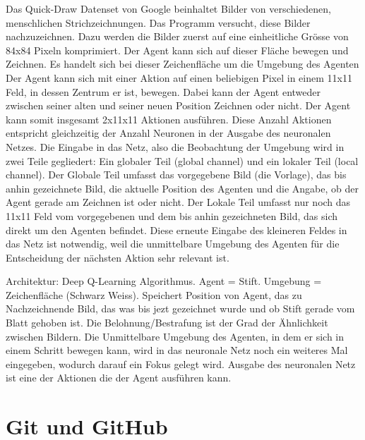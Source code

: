 Das Quick-Draw Datenset von Google beinhaltet Bilder von verschiedenen,
menschlichen Strichzeichnungen. Das Programm versucht, diese Bilder
nachzuzeichnen. Dazu werden die Bilder zuerst auf eine einheitliche Grösse von
84x84 Pixeln komprimiert. Der Agent kann sich auf dieser Fläche bewegen und
Zeichnen. Es handelt sich bei dieser Zeichenfläche um die Umgebung des Agenten
Der Agent kann sich mit einer Aktion auf einen beliebigen Pixel in einem 11x11
Feld, in dessen Zentrum er ist, bewegen. Dabei kann der Agent entweder zwischen
seiner alten und seiner neuen Position Zeichnen oder nicht. Der Agent kann somit
insgesamt 2x11x11 Aktionen ausführen. Diese Anzahl Aktionen entspricht
gleichzeitig der Anzahl Neuronen in der Ausgabe des neuronalen Netzes. Die
Eingabe in das Netz, also die Beobachtung der Umgebung wird in zwei Teile
gegliedert: Ein globaler Teil (global channel) und ein lokaler Teil (local
channel). Der Globale Teil umfasst das vorgegebene Bild (die Vorlage), das bis
anhin gezeichnete Bild, die aktuelle Position des Agenten und die Angabe, ob der
Agent gerade am Zeichnen ist oder nicht. Der Lokale Teil umfasst nur noch das
11x11 Feld vom vorgegebenen und dem bis anhin gezeichneten Bild, das sich direkt
um den Agenten befindet. Diese erneute Eingabe des kleineren Feldes in das Netz
ist notwendig, weil die unmittelbare Umgebung des Agenten für die Entscheidung
der nächsten Aktion sehr relevant ist. 



Architektur: Deep Q-Learning Algorithmus.
Agent = Stift. Umgebung = Zeichenfläche (Schwarz Weiss). Speichert Position von
Agent, das zu Nachzeichnende Bild, das was bis jezt gezeichnet wurde und ob
Stift gerade vom Blatt gehoben ist. Die Belohnung/Bestrafung ist der Grad der
Ähnlichkeit zwischen Bildern. Die Unmittelbare Umgebung des Agenten, in dem er
sich in einem Schritt bewegen kann, wird in das neuronale Netz noch ein weiteres
Mal eingegeben, wodurch darauf ein Fokus gelegt wird. Ausgabe des neuronalen
Netz ist eine der Aktionen die der Agent ausführen kann.



\section{Git und GitHub}
\label{chap:t_git}



